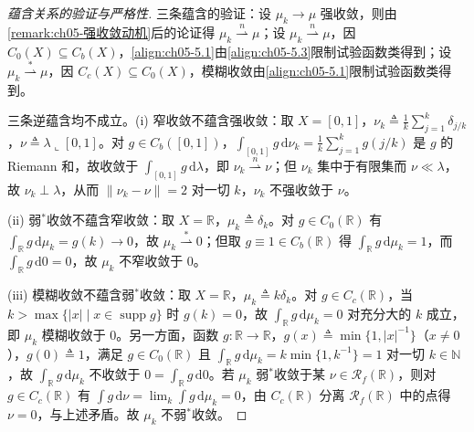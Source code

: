 \documentclass[../../main.tex]{subfiles}%
\begin{document}
\begin{proof}[蕴含关系的验证与严格性]
三条蕴含的验证：设 $\mu_k\to\mu$ 强收敛，则由\cref{remark:ch05-强收敛动机}后的论证得 $\mu_k\stackrel{n}{\rightharpoonup}\mu$；设 $\mu_k\stackrel{n}{\rightharpoonup}\mu$，因 $C_0(X)\subseteq C_b(X)$，\eqref{align:ch05-5.1}由\eqref{align:ch05-5.3}限制试验函数类得到；设 $\mu_k\stackrel{*}{\rightharpoonup}\mu$，因 $C_c(X)\subseteq C_0(X)$，模糊收敛由\eqref{align:ch05-5.1}限制试验函数类得到。

三条逆蕴含均不成立。(i) 窄收敛不蕴含强收敛：取 $X=[0,1]$，$\nu_k\triangleq\frac1k\sum_{j=1}^k\delta_{j/k}$，$\nu\triangleq\lambda\llcorner[0,1]$。对 $g\in C_b([0,1])$，$\int_{[0,1]}g\,\mathrm{d}\nu_k=\frac1k\sum_{j=1}^k g(j/k)$ 是 $g$ 的 Riemann 和，故收敛于 $\int_{[0,1]}g\,\mathrm{d}\lambda$，即 $\nu_k\stackrel{n}{\rightharpoonup}\nu$；但 $\nu_k$ 集中于有限集而 $\nu\ll\lambda$，故 $\nu_k\perp\lambda$，从而 $\|\nu_k-\nu\|=2$ 对一切 $k$，$\nu_k$ 不强收敛于 $\nu$。

(ii) 弱$^*$收敛不蕴含窄收敛：取 $X=\mathbb{R}$，$\mu_k\triangleq\delta_k$。对 $g\in C_0(\mathbb{R})$ 有 $\int_{\mathbb{R}}g\,\mathrm{d}\mu_k=g(k)\to0$，故 $\mu_k\stackrel{*}{\rightharpoonup}0$；但取 $g\equiv1\in C_b(\mathbb{R})$ 得 $\int_{\mathbb{R}}g\,\mathrm{d}\mu_k=1$，而 $\int_{\mathbb{R}}g\,\mathrm{d}0=0$，故 $\mu_k$ 不窄收敛于 $0$。

(iii) 模糊收敛不蕴含弱$^*$收敛：取 $X=\mathbb{R}$，$\mu_k\triangleq k\delta_k$。对 $g\in C_c(\mathbb{R})$，当 $k>\max\{|x|\mid x\in\operatorname{supp}g\}$ 时 $g(k)=0$，故 $\int_{\mathbb{R}}g\,\mathrm{d}\mu_k=0$ 对充分大的 $k$ 成立，即 $\mu_k$ 模糊收敛于 $0$。另一方面，函数 $g:\mathbb{R}\to\mathbb{R}$，$g(x)\triangleq\min\{1,|x|^{-1}\}$（$x\neq0$），$g(0)\triangleq1$，满足 $g\in C_0(\mathbb{R})$ 且 $\int_{\mathbb{R}}g\,\mathrm{d}\mu_k=k\min\{1,k^{-1}\}=1$ 对一切 $k\in\mathbb{N}$，故 $\int_{\mathbb{R}}g\,\mathrm{d}\mu_k$ 不收敛于 $0=\int_{\mathbb{R}}g\,\mathrm{d}0$。若 $\mu_k$ 弱$^*$收敛于某 $\nu\in\mathscr{R}_f(\mathbb{R})$，则对 $g\in C_c(\mathbb{R})$ 有 $\int g\,\mathrm{d}\nu=\lim_k\int g\,\mathrm{d}\mu_k=0$，由 $C_c(\mathbb{R})$ 分离 $\mathscr{R}_f(\mathbb{R})$ 中的点得 $\nu=0$，与上述矛盾。故 $\mu_k$ 不弱$^*$收敛。
\end{proof}
\end{document}

